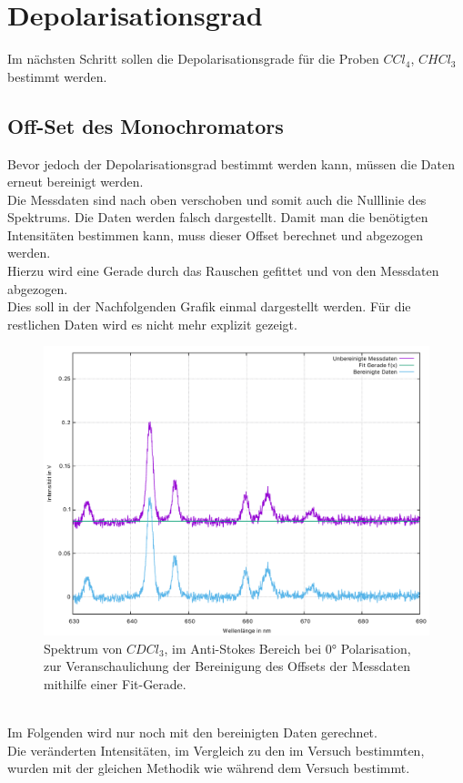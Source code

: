 \section{Depolarisationsgrad}
Im nächsten Schritt sollen die Depolarisationsgrade für die Proben $CCl_4$, $CHCl_3$ 
bestimmt werden.\\
\subsection{Off-Set des Monochromators}
Bevor jedoch der Depolarisationsgrad bestimmt werden kann, müssen die Daten erneut bereinigt werden.\\
Die Messdaten sind nach oben verschoben und somit auch die Nulllinie des Spektrums. Die Daten 
werden falsch dargestellt. Damit
man die benötigten Intensitäten bestimmen kann, muss dieser Offset berechnet und abgezogen werden. \\
Hierzu wird eine Gerade durch das Rauschen gefittet und von den Messdaten abgezogen. \\
Dies soll in der Nachfolgenden Grafik einmal dargestellt werden. Für die restlichen Daten 
wird es nicht mehr explizit gezeigt.\\
\begin{figure}[h]
  \centering
  \includegraphics[scale=0.6]{Bilder/Verbesserung_Auswertung/Offset.pdf}
  \caption{Spektrum von $CDCl_3$, im Anti-Stokes Bereich bei 0° Polarisation, zur Veranschaulichung
  der Bereinigung des Offsets  der Messdaten mithilfe einer Fit-Gerade.}
\end{figure}\\
Im Folgenden wird nur noch mit den bereinigten Daten gerechnet.\\
Die veränderten Intensitäten, im Vergleich zu den im Versuch bestimmten, wurden mit der gleichen
Methodik wie während dem Versuch bestimmt.
\newpage
